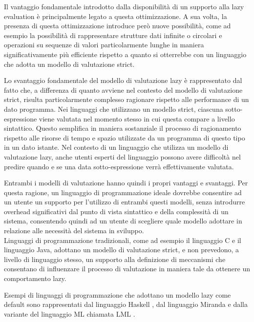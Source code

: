 Il vantaggio fondamentale introdotto dalla disponibilità di un supporto alla lazy
evaluation è principalmente legato a questa ottimizzazione. A sua volta, la
presenza di questa ottimizzazione introduce però nuove possibilità, come ad
esempio la possibilità di rappresentare strutture dati infinite o circolari e
operazioni su sequenze di valori particolarmente lunghe in maniera
significativamente più efficiente rispetto a quanto si otterrebbe con un
linguaggio che adotta un modello di valutazione strict.

Lo svantaggio fondamentale del modello di valutazione lazy è rappresentato dal
fatto che, a differenza di quanto avviene nel contesto del modello di
valutazione strict, risulta particolarmente complesso ragionare rispetto alle
performance di un dato programma. Nei linguaggi che utilizzano un modello
strict, ciascuna sotto-espressione viene valutata nel momento stesso in cui
questa compare a livello sintattico. Questo semplifica in maniera sostanziale il
processo di ragionamento rispetto alle risorse di tempo e spazio utilizzate da
un programma di questo tipo in un dato istante. Nel contesto di un linguaggio
che utilizza un modello di valutazione lazy, anche utenti esperti del linguaggio
possono avere difficoltà nel predire quando e se una data sotto-espressione
verrà effettivamente valutata.

Entrambi i modelli di valutazione hanno quindi i propri vantaggi e svantaggi.
Per questa ragione, un linguaggio di programmazione ideale dovrebbe consentire
ad un utente un supporto per l'utilizzo di entrambi questi modelli, senza
introdurre overhead significativi dal punto di vista sintattico e della
complessità di un sistema, consentendo quindi ad un utente di scegliere quale
modello adottare in relazione alle necessità del sistema in sviluppo.\\

Linguaggi di programmazione tradizionali, come ad esempio il linguaggio C e il
linguaggio Java, adottano un modello di valutazione strict, e non prevedono, a
livello di linguaggio stesso, un supporto alla definizione di meccanismi che
consentano di influenzare il processo di valutazione in maniera tale da ottenere
un comportamento lazy.

Esempi di linguaggi di programmazione che adottano un modello lazy come default
sono rappresentati dal linguaggio Haskell \cite{DBLP:conf/hopl/HudakHJW07}, dal
linguaggio Miranda \cite{DBLP:journals/eatcs/Turner87} e dalla variante del
linguaggio ML chiamata LML \cite{DBLP:conf/lfp/Augustsson84}.


